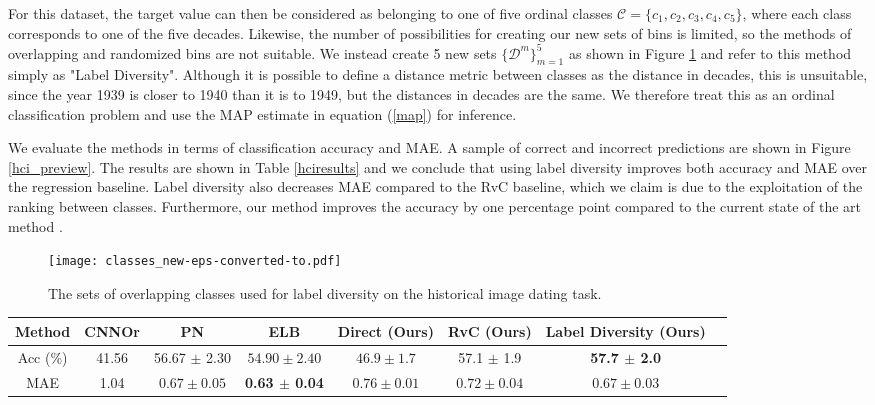 \documentclass[10pt, conference, a4paper]{IEEEtran}
\begin{document}
For this dataset, the target value can then be considered as belonging to one of five ordinal classes $\mathcal{C} = \{c_1, c_2, c_3, c_4, c_5\}$, where each class corresponds to one of the five decades.  Likewise, the number of possibilities for creating our new sets of bins is limited, so the methods of overlapping and randomized bins are not suitable. We instead create 5 new sets $\{\mathcal{D}^m\}_{m=1}^5$ as shown in Figure \ref{hist_bins} and refer to this method simply as "Label Diversity". Although it is possible to define a distance metric between classes as the distance in decades, this is unsuitable, since the year 1939 is closer to 1940 than it is to 1949, but the distances in decades are the same. We therefore treat this as an ordinal classification problem and use the MAP estimate in equation (\ref{map}) for inference. 

We evaluate the methods in terms of classification accuracy and MAE. A sample of correct and incorrect predictions are shown in Figure \ref{hci_preview}. The results are shown in Table \ref{hciresults} and we conclude that using label diversity improves both accuracy and MAE over the regression baseline. Label diversity also decreases MAE compared to the RvC baseline, which we claim is due to the exploitation of the ranking between classes. Furthermore, our method improves the accuracy by one percentage point compared to the current state of the art method \cite{belharbi2019deep}.

\begin{figure}[t]
  \centering
  \texttt{[image: classes\_new-eps-converted-to.pdf]}
  \caption{The sets of overlapping classes used for label diversity on the historical image dating task.}
  \label{hist_bins}
\end{figure}

\begin{table*}[t]
\renewcommand{\arraystretch}{1.3}
\caption{Accuracy and mean average error in decades for the different methods on the HCI dataset \cite{DBLP:conf/eccv/PalermoHE12}.}
\label{hciresults}
\centering
\begin{tabular}{c c c c c c c c}
\hline
Method & CNNOr \cite{liu2017deep}   & PN \cite{belharbi2019deep} & ELB \cite{belharbi2019deep} & Direct (Ours) & RvC (Ours) & Label Diversity (Ours)\\
\hline
Acc (\%) & 41.56 &  56.67 $\pm$ 2.30 & $54.90 \pm 2.40$ & $46.9 \pm 1.7$ & 57.1 $\pm$ 1.9 & \textbf{57.7 $\pm$ 2.0}    \\
MAE & 1.04 & $0.67 \pm 0.05$ & \textbf{0.63 $\pm$ 0.04} & $0.76 \pm 0.01$ & $0.72 \pm 0.04$ & $0.67 \pm 0.03$ \\ 
\hline
\end{tabular}
\end{table*}
\end{document}
